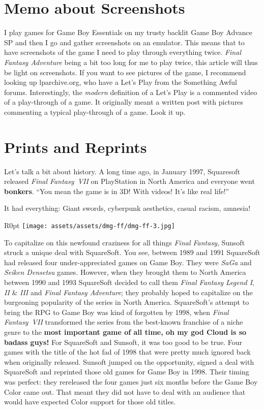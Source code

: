 \documentclass{book}
\begin{document}
\FloatBarrier\needspace{5pt}\section*{Memo about Screenshots}\nopagebreak[4]

I play games for Game Boy Essentials on my trusty backlit Game Boy Advance SP and then I go and gather screenshots on an emulator. This means that to have screenshots of the game I need to play through everything twice. \emph{Final Fantasy Adventure} being a bit too long for me to play twice, this article will thus be light on screenshots. If you want to see pictures of the game, I recommend looking up lparchive.org, who have a Let’s Play from the Something Awful forums. Interestingly, the \emph{modern} definition of a Let’s Play is a commented video of a play-through of a game. It originally meant a written post with pictures commenting a typical play-through of a game. Look it up.

\FloatBarrier\needspace{5pt}\section*{Prints and Reprints}\nopagebreak[4]

Let’s talk a bit about history. A long time ago, in January 1997, Squaresoft released \emph{Final Fantasy VII} on PlayStation in North America and everyone went \textbf{bonkers}. “You mean the game is in 3D! With videos! It’s like real life!”

It had everything: Giant swords, cyberpunk aesthetics, casual racism, amnesia!

\begin{wrapfigure}{R}{0pt} \texttt{[image: assets/assets/dmg-ff/dmg-ff-3.jpg]}\end{wrapfigure}
To capitalize on this newfound craziness for all things \emph{Final Fantasy}, Sunsoft struck a unique deal with SquareSoft. You see, between 1989 and 1991 SquareSoft had released four under-appreciated games on Game Boy. They were \emph{SaGa} and \emph{Seiken Densetsu} games. However, when they brought them to North America between 1990 and 1993 SquareSoft decided to call them \emph{Final Fantasy Legend I}, \emph{II} \& \emph{III} and \emph{Final Fantasy Adventure}; they probably hoped to capitalize on the burgeoning popularity of the series in North America. SquareSoft’s attempt to bring the RPG to Game Boy was kind of forgotten by 1998, when \emph{Final Fantasy VII} transformed the series from the best-known franchise of a niche genre to the \textbf{most important game of all time, oh my god Cloud is so badass guys!} For SquareSoft and Sunsoft, it was too good to be true. Four games with the title of the hot fad of 1998 that were pretty much ignored back when originally released. Sunsoft jumped on the opportunity, signed a deal with SquareSoft and reprinted those old games for Game Boy in 1998. Their timing was perfect: they rereleased the four games just six months before the Game Boy Color came out. That meant they did not have to deal with an audience that would have expected Color support for those old titles.
\end{document}
